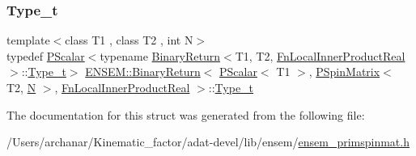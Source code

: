 \subsubsection{\texorpdfstring{Type\_t}{Type\_t}\hspace{0.1cm}{\footnotesize\ttfamily [3/3]}}
{\footnotesize\ttfamily template$<$class T1 , class T2 , int N$>$ \\
typedef \mbox{\hyperlink{classENSEM_1_1PScalar}{P\+Scalar}}$<$typename \mbox{\hyperlink{structENSEM_1_1BinaryReturn}{Binary\+Return}}$<$T1, T2, \mbox{\hyperlink{structENSEM_1_1FnLocalInnerProductReal}{Fn\+Local\+Inner\+Product\+Real}}$>$\+::\mbox{\hyperlink{structENSEM_1_1BinaryReturn_3_01PScalar_3_01T1_01_4_00_01PSpinMatrix_3_01T2_00_01N_01_4_00_01FnLocalInnerProductReal_01_4_a2d037716a340f0dc776a97f527be37c6}{Type\+\_\+t}}$>$ \mbox{\hyperlink{structENSEM_1_1BinaryReturn}{E\+N\+S\+E\+M\+::\+Binary\+Return}}$<$ \mbox{\hyperlink{classENSEM_1_1PScalar}{P\+Scalar}}$<$ T1 $>$, \mbox{\hyperlink{classENSEM_1_1PSpinMatrix}{P\+Spin\+Matrix}}$<$ T2, \mbox{\hyperlink{adat__devel_2lib_2hadron_2operator__name__util_8cc_a7722c8ecbb62d99aee7ce68b1752f337}{N}} $>$, \mbox{\hyperlink{structENSEM_1_1FnLocalInnerProductReal}{Fn\+Local\+Inner\+Product\+Real}} $>$\+::\mbox{\hyperlink{structENSEM_1_1BinaryReturn_3_01PScalar_3_01T1_01_4_00_01PSpinMatrix_3_01T2_00_01N_01_4_00_01FnLocalInnerProductReal_01_4_a2d037716a340f0dc776a97f527be37c6}{Type\+\_\+t}}}



The documentation for this struct was generated from the following file\+:\begin{DoxyCompactItemize}
\item 
/\+Users/archanar/\+Kinematic\+\_\+factor/adat-\/devel/lib/ensem/\mbox{\hyperlink{adat-devel_2lib_2ensem_2ensem__primspinmat_8h}{ensem\+\_\+primspinmat.\+h}}\end{DoxyCompactItemize}
